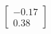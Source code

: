 \documentclass[preview]{standalone}
\begin{document}
\begin{align*}
\begin{bmatrix} -0.17 \\ 0.38 \end{bmatrix}
\end{align*}
\end{document}
